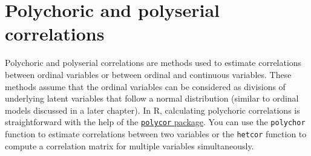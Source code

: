 \documentclass[
]{book}
\newenvironment{Shaded}{\begin{snugshade}}{\end{snugshade}}
\newcommand{\CommentTok}[1]{\textcolor[rgb]{0.56,0.35,0.01}{\textit{#1}}}
\newcommand{\ConstantTok}[1]{\textcolor[rgb]{0.56,0.35,0.01}{#1}}
\newcommand{\ControlFlowTok}[1]{\textcolor[rgb]{0.13,0.29,0.53}{\textbf{#1}}}
\newcommand{\DecValTok}[1]{\textcolor[rgb]{0.00,0.00,0.81}{#1}}
\newcommand{\FloatTok}[1]{\textcolor[rgb]{0.00,0.00,0.81}{#1}}
\newcommand{\FunctionTok}[1]{\textcolor[rgb]{0.13,0.29,0.53}{\textbf{#1}}}
\newcommand{\NormalTok}[1]{#1}
\newcommand{\OtherTok}[1]{\textcolor[rgb]{0.56,0.35,0.01}{#1}}
\newcommand{\SpecialCharTok}[1]{\textcolor[rgb]{0.81,0.36,0.00}{\textbf{#1}}}
\begin{document}
\begin{Shaded}
\end{Shaded}

\section{Polychoric and polyserial correlations}\label{polychoric-and-polyserial-correlations}

Polychoric and polyserial correlations are methods used to estimate correlations between ordinal variables or between ordinal and continuous variables. These methods assume that the ordinal variables can be considered as divisions of underlying latent variables that follow a normal distribution (similar to ordinal models discussed in a later chapter). In R, calculating polychoric correlations is straightforward with the help of the \href{https://cran.r-project.org/web/packages/polycor/index.html}{\texttt{polycor} package}. You can use the \texttt{polychor} function to estimate correlations between two variables or the \texttt{hetcor} function to compute a correlation matrix for multiple variables simultaneously.
\end{document}
